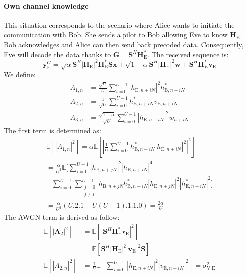 \documentclass[journal,comsoc]{IEEEtran}
\newcommand{\module}[1]{\left|#1\right|}
\newcommand{\EX}[1]{\mathbb{E} \left[#1\right]}%
\newcommand{\HE}{\textbf{H}_{\text{E}}}
\newcommand{\HB}{\textbf{H}_{\text{B}}}
\newcommand{\ve}{\textbf{v}_{\text{E}}}
\newcommand{\spread}{\textbf{S}}
\newcommand{\w}{\textbf{w}}
\begin{document}
\paragraph{Own channel knowledge}
\label{sec:own-channel-knowledge}
This situation corresponds to the scenario where Alice wants to initiate the communication with Bob. She sends a pilot to Bob allowing Eve to know $\HE$. Bob acknowledges and Alice can then send back precoded data. Consequently, Eve will decode the data thanks to $\textbf{G} = \spread^H \HE^*$. The received sequence is:
\begin{equation}
	\textbf{y}_{\text{E}}^G = \sqrt{\alpha} \spread^H \module{\HE}^2 \HB^* \spread\textbf{x} +  \sqrt{1-\alpha} \spread^H \module{\HE}^2 \w  +  \spread^H  \textbf{H}^*_E  \ve
	\label{eq:rx_eve_filt5}
\end{equation}
We define: 
\begin{equation}
\begin{split}
A_{1,n} &= \frac{\sqrt{\alpha}}{U}\sum_{i=0}^{U-1}  \left|h_{\text{E}, n + iN}\right|^2  h_{\text{B}, n + iN}^* \\
A_{2,n} &= \frac{1}{\sqrt{U}}\sum_{i=0}^{U-1} h^*_{\text{E}, n + iN}  v_{\text{E}, n + iN}\\
A_{3,n} &=\frac{ \sqrt{1-\alpha}  }{\sqrt{U}}\sum_{i=0}^{U-1}   \left|h_{\text{E}, n + iN}\right|^2 w_{n + iN}
\end{split}
\end{equation}
The first term is determined as:
\begin{multline}
\EX{|A_{1,n}|^2} = \alpha \EX{\left|\frac{1}{U}\sum_{i=0}^{U-1} h_{\text{B}, n + iN}^* \left| h_{\text{E}, n + iN}\right|^2\right|^2} \\
=\frac{\alpha}{U^2} \mathbb{E}\Bigg[ \sum_{i=0}^{U-1} \left| h_{\text{B}, n + jN}\right|^2 \left| h_{\text{E}, n + iN}\right|^4 \\
+ \sum_{i=0}^{U-1}\sum_{\substack{j=0 \\ j\neq i}}^{U-1}  h_{\text{B}, n + jN} h^*_{\text{B}, n + iN} \left| h_{\text{E}, n + jN}\right|^2 \left| h^*_{\text{E}, n + iN}\right|^2 \Bigg] \\
= \frac{\alpha}{U^2} \left(U.2.1 + U(U-1).1.1.0\right) = \frac{2\alpha}{U}
\label{eq:data_eve_filt5}
\end{multline}
The AWGN term is derived as follow:
\begin{equation}
\begin{split}
\EX{|\textbf{A}_{2}|^2} &=  \EX{\module{\spread^H \HE^* \ve}^2} \\
&=\EX{\spread^H   \left|\HE\right|^2  \left|\ve\right|^2 \spread } \\
\EX{|A_{2,n}|^2} &= \frac{1}{U} \EX{\sum_{i=0}^{U-1} |h_{\text{E}, n + iN}|^2 |v_{\text{E}, n + iN}|^2} = \sigma^2_{\text{V,E}}
\end{split}
\label{eq:noise_eve_filt5}
\end{equation}
\end{document}
